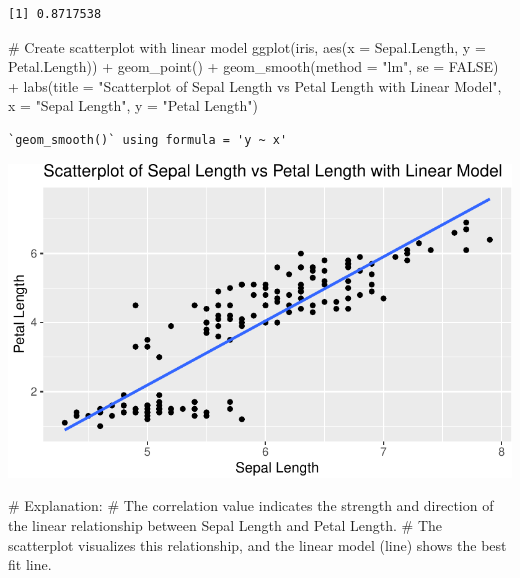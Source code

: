 \documentclass[
  letterpaper,
  DIV=11,
  numbers=noendperiod]{scrreprt}
\newenvironment{Shaded}{\begin{snugshade}}{\end{snugshade}}
\newcommand{\AttributeTok}[1]{\textcolor[rgb]{0.40,0.45,0.13}{#1}}
\newcommand{\CommentTok}[1]{\textcolor[rgb]{0.37,0.37,0.37}{#1}}
\newcommand{\ConstantTok}[1]{\textcolor[rgb]{0.56,0.35,0.01}{#1}}
\newcommand{\FunctionTok}[1]{\textcolor[rgb]{0.28,0.35,0.67}{#1}}
\newcommand{\NormalTok}[1]{\textcolor[rgb]{0.00,0.23,0.31}{#1}}
\newcommand{\SpecialCharTok}[1]{\textcolor[rgb]{0.37,0.37,0.37}{#1}}
\newcommand{\StringTok}[1]{\textcolor[rgb]{0.13,0.47,0.30}{#1}}
\begin{document}
\begin{verbatim}
[1] 0.8717538
\end{verbatim}

\begin{Shaded}
\begin{Highlighting}[]
\CommentTok{\# Create scatterplot with linear model}
\FunctionTok{ggplot}\NormalTok{(iris, }\FunctionTok{aes}\NormalTok{(}\AttributeTok{x =}\NormalTok{ Sepal.Length, }\AttributeTok{y =}\NormalTok{ Petal.Length)) }\SpecialCharTok{+}
  \FunctionTok{geom\_point}\NormalTok{() }\SpecialCharTok{+}
  \FunctionTok{geom\_smooth}\NormalTok{(}\AttributeTok{method =} \StringTok{"lm"}\NormalTok{, }\AttributeTok{se =} \ConstantTok{FALSE}\NormalTok{) }\SpecialCharTok{+}
  \FunctionTok{labs}\NormalTok{(}\AttributeTok{title =} \StringTok{"Scatterplot of Sepal Length vs Petal Length with Linear Model"}\NormalTok{, }\AttributeTok{x =} \StringTok{"Sepal Length"}\NormalTok{, }\AttributeTok{y =} \StringTok{"Petal Length"}\NormalTok{)}
\end{Highlighting}
\end{Shaded}

\begin{verbatim}
`geom_smooth()` using formula = 'y ~ x'
\end{verbatim}

\includegraphics{Linear_Modeling_and_Regression_files/figure-pdf/unnamed-chunk-16-1.pdf}

\begin{Shaded}
\begin{Highlighting}[]
\CommentTok{\# Explanation:}
\CommentTok{\# The correlation value indicates the strength and direction of the linear relationship between Sepal Length and Petal Length.}
\CommentTok{\# The scatterplot visualizes this relationship, and the linear model (line) shows the best fit line.}
\end{Highlighting}
\end{Shaded}
\end{document}
